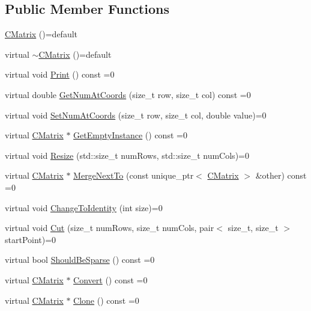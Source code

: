 \subsection*{Public Member Functions}
\begin{DoxyCompactItemize}
\item 
\hyperlink{classCMatrix_ab91da59b03ce55dc412bc69578ecc855}{C\+Matrix} ()=default
\item 
virtual \hyperlink{classCMatrix_a0c4bbe807ddb1122065db4c3e3d6f964}{$\sim$\+C\+Matrix} ()=default
\item 
virtual void \hyperlink{classCMatrix_a424a048d20918f0f041f4a8645823ae7}{Print} () const =0
\item 
virtual double \hyperlink{classCMatrix_afa0213e0a6c5823e6b6e786891cc5f2d}{Get\+Num\+At\+Coords} (size\+\_\+t row, size\+\_\+t col) const =0
\item 
virtual void \hyperlink{classCMatrix_afeba0f7cfcc2623bde41cf6111b0ef6a}{Set\+Num\+At\+Coords} (size\+\_\+t row, size\+\_\+t col, double value)=0
\item 
virtual \hyperlink{classCMatrix}{C\+Matrix} $\ast$ \hyperlink{classCMatrix_a7495208c2bd786fe46b130f6090e7eb5}{Get\+Empty\+Instance} () const =0
\item 
virtual void \hyperlink{classCMatrix_adb83eafeeea2025f9c84d172f1bb0f1e}{Resize} (std\+::size\+\_\+t num\+Rows, std\+::size\+\_\+t num\+Cols)=0
\item 
virtual \hyperlink{classCMatrix}{C\+Matrix} $\ast$ \hyperlink{classCMatrix_a2c6c995b372eae3f9544370dda681b48}{Merge\+Next\+To} (const unique\+\_\+ptr$<$ \hyperlink{classCMatrix}{C\+Matrix} $>$ \&other) const =0
\item 
virtual void \hyperlink{classCMatrix_acdea7a5c6e3d858c3556881217a43dc3}{Change\+To\+Identity} (int size)=0
\item 
virtual void \hyperlink{classCMatrix_adb39522856d76de67d5b29c418c45ccd}{Cut} (size\+\_\+t num\+Rows, size\+\_\+t num\+Cols, pair$<$ size\+\_\+t, size\+\_\+t $>$ start\+Point)=0
\item 
virtual bool \hyperlink{classCMatrix_a668eaab1f5d9b498e721464124f158c4}{Should\+Be\+Sparse} () const =0
\item 
virtual \hyperlink{classCMatrix}{C\+Matrix} $\ast$ \hyperlink{classCMatrix_aca808472e6465738fae14a6ac244cf0b}{Convert} () const =0
\item 
virtual \hyperlink{classCMatrix}{C\+Matrix} $\ast$ \hyperlink{classCMatrix_a42ac1f2a9e69919974febca17971be60}{Clone} () const =0
\item 

\end{DoxyCompactItemize}
